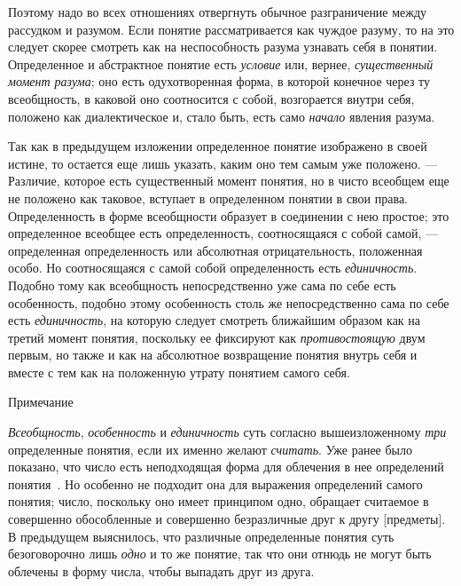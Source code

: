 \documentclass[twoside]{article}
\begin{document}
{{Поэтому надо во всех отношениях отвергнуть обычное
разграничение между рассудком и разумом. Если понятие рассматривается как
чуждое разуму, то на это следует скорее смотреть как на неспособность
разума узнавать себя в понятии. Определенное и абстрактное понятие есть
{\em условие} или,
вернее, {\em существенный момент
разума}; оно есть одухотворенная форма, в которой конечное
через ту всеобщность, в каковой оно соотносится с собой, возгорается внутри
себя, положено как диалектическое и, стало быть, есть само
{\em начало} явления
разума.

Так как в предыдущем изложении определенное понятие изображено
в своей истине, то остается еще лишь указать, каким оно тем самым уже
положено. — Различие, которое есть существенный момент
понятия, но в чисто всеобщем еще не положено как таковое, вступает в
определенном понятии в свои права. Определенность в форме всеобщности
образует в соединении с нею простое; это определенное
всеобщее есть определенность, соотносящаяся с собой самой, —
определенная определенность или абсолютная отрицательность,
положенная особо. Но соотносящаяся с самой собой определенность есть
{\em единичность}.
Подобно тому как всеобщность непосредственно уже сама по себе
есть особенность, подобно этому особенность столь же непосредственно сама
по себе есть {\em единичность},
на которую следует смотреть ближайшим образом как на третий
момент понятия, поскольку ее фиксируют как
{\em противостоящую} двум
первым, но также и как на абсолютное возвращение понятия внутрь себя и
вместе с тем как на положенную утрату понятием самого себя.

{\centering
Примечание
\newline
{}\label{bkm:bm20}
\par}

{\em Всеобщность},
{\em особенность} и
{\em единичность} суть
согласно вышеизложенному {\em три}
определенные понятия, если их именно желают
{\em считать}. Уже ранее
было показано, что число есть неподходящая форма для облечения в нее
определений
понятия~\label{bkm:bm21}.
Но особенно не подходит она для выражения определений самого
понятия; число, поскольку оно имеет принципом одно, обращает считаемое в
совершенно обособленные и совершенно безразличные друг к другу [предметы].
В предыдущем выяснилось, что различные определенные понятия суть
безоговорочно лишь {\em одно}
и то же понятие, так что они отнюдь не могут быть облечены в
форму числа, чтобы выпадать друг из друга.

}}
\end{document}

